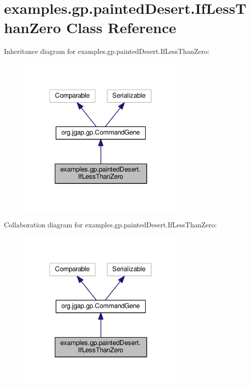 \hypertarget{classexamples_1_1gp_1_1painted_desert_1_1_if_less_than_zero}{\section{examples.\-gp.\-painted\-Desert.\-If\-Less\-Than\-Zero Class Reference}
\label{classexamples_1_1gp_1_1painted_desert_1_1_if_less_than_zero}
}


Inheritance diagram for examples.\-gp.\-painted\-Desert.\-If\-Less\-Than\-Zero\-:
\nopagebreak
\begin{figure}[H]
\begin{center}
\leavevmode
\includegraphics[width=233pt]{classexamples_1_1gp_1_1painted_desert_1_1_if_less_than_zero__inherit__graph}
\end{center}
\end{figure}


Collaboration diagram for examples.\-gp.\-painted\-Desert.\-If\-Less\-Than\-Zero\-:
\nopagebreak
\begin{figure}[H]
\begin{center}
\leavevmode
\includegraphics[width=233pt]{classexamples_1_1gp_1_1painted_desert_1_1_if_less_than_zero__coll__graph}
\end{center}
\end{figure}
